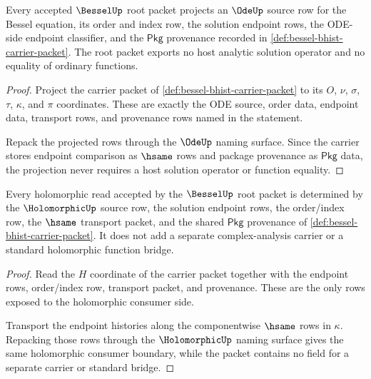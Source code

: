 \begin{theorem}
\label{thm:bessel-root-ode-source-obligation}
Every accepted $\BesselUp$ root packet projects an $\OdeUp$ source row for
the Bessel equation, its order and index row, the solution endpoint rows, the
ODE-side endpoint classifier, and the $\mathsf{Pkg}$ provenance recorded in
\autoref{def:bessel-bhist-carrier-packet}. The root packet exports no host
analytic solution operator and no equality of ordinary functions.
\end{theorem}
\begin{proof}
Project the carrier packet of
\autoref{def:bessel-bhist-carrier-packet} to its $O$, $\nu$, $\sigma$,
$\tau$, $\kappa$, and $\pi$ coordinates. These are exactly the ODE source,
order data, endpoint data, transport rows, and provenance rows named in the
statement.

Repack the projected rows through the $\OdeUp$ naming surface. Since the
carrier stores endpoint comparison as $\hsame$ rows and package provenance as
$\mathsf{Pkg}$ data, the projection never requires a host solution operator
or function equality.
\end{proof}

\begin{theorem}
\label{thm:bessel-holomorphic-consumer-boundary}
Every holomorphic read accepted by the $\BesselUp$ root packet is determined
by the $\HolomorphicUp$ source row, the solution endpoint rows, the
order/index row, the $\hsame$ transport packet, and the shared
$\mathsf{Pkg}$ provenance of \autoref{def:bessel-bhist-carrier-packet}. It
does not add a separate complex-analysis carrier or a standard holomorphic
function bridge.
\end{theorem}
\begin{proof}
Read the $H$ coordinate of the carrier packet together with the endpoint
rows, order/index row, transport packet, and provenance. These are the only
rows exposed to the holomorphic consumer side.

Transport the endpoint histories along the componentwise $\hsame$ rows in
$\kappa$. Repacking those rows through the $\HolomorphicUp$ naming surface
gives the same holomorphic consumer boundary, while the packet contains no
field for a separate carrier or standard bridge.
\end{proof}

